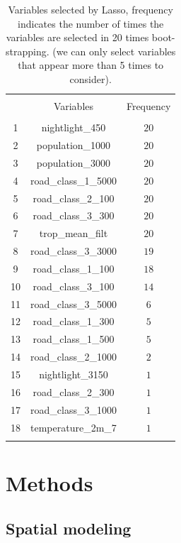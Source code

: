 \documentclass{article}
\begin{document}
  \begin{table}[!htbp] \centering 
  \caption{Variables selected by Lasso, frequency indicates the number of times the variables are selected in 20 times boot-strapping. (we can only select variables that appear more than 5 times to consider).} 
  \label{lassoselect} 
\begin{tabular}{@{\extracolsep{5pt}} ccc} 
\\[-1.8ex]\hline 
\hline \\[-1.8ex] 
 & Variables & Frequency \\ 
\hline \\[-1.8ex] 
 1 & nightlight\_450 & $20$ \\ 
2 & population\_1000 & $20$ \\ 
3 & population\_3000 & $20$ \\ 
4 & road\_class\_1\_5000 & $20$ \\ 
5 & road\_class\_2\_100 & $20$ \\ 
6 & road\_class\_3\_300 & $20$ \\ 
7 & trop\_mean\_filt & $20$ \\ 
8 & road\_class\_3\_3000 & $19$ \\ 
9 & road\_class\_1\_100 & $18$ \\ 
10 & road\_class\_3\_100 & $14$ \\ 
11 & road\_class\_3\_5000 & $6$ \\ 
12 & road\_class\_1\_300 & $5$ \\ 
13 & road\_class\_1\_500 & $5$ \\ 
14 & road\_class\_2\_1000 & $2$ \\ 
15 & nightlight\_3150 & $1$ \\ 
16 & road\_class\_2\_300 & $1$ \\ 
17 & road\_class\_3\_1000 & $1$ \\ 
18 & temperature\_2m\_7 & $1$ \\  
 
\hline \\[-1.8ex] 
\end{tabular} 
\end{table} 

\section {Methods}

\subsection{Spatial modeling}
\end{document}
